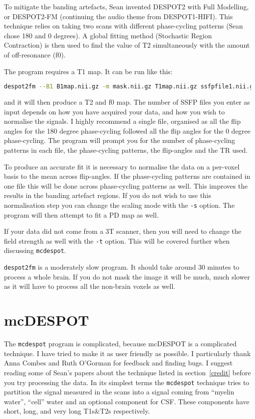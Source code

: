 \documentclass{report}
\begin{document}
To mitigate the banding artefacts, Sean invented DESPOT2 with Full Modelling, or DESPOT2-FM (continuing the audio theme from DESPOT1-HIFI). This technique relies on taking two scans with different phase-cycling patterns (Sean chose 180 and 0 degrees). A global fitting method (Stochastic Region Contraction) is then used to find the value of T2 simultaneously with the amount of off-resonance (f0).

The program requires a T1 map. It can be run like this:

\begin{lstlisting}[language=sh]
despot2fm --B1 B1map.nii.gz -m mask.nii.gz T1map.nii.gz ssfpfile1.nii.gz ssfpfile2.nii.gz
\end{lstlisting}

and it will then produce a T2 and f0 map. The number of SSFP files you enter as input depends on how you have acquired your data, and how you wish to normalise the signals. I highly recommend a single file, organised as all the flip angles for the 180 degree phase-cycling followed all the flip angles for the 0 degree phase-cycling. The program will prompt you for the number of phase-cycling patterns in each file, the phase-cycling patterns, the flip-angles and the TR used.

To produce an accurate fit it is necessary to normalise the data on a per-voxel basis to the mean across flip-angles. If the phase-cycling patterns are contained in one file this will be done across phase-cycling patterns as well. This improves the results in the banding artefact regions. If you do not wish to use this normalisation step you can change the scaling mode with the \texttt{-s} option. The program will then attempt to fit a PD map as well.

If your data did not come from a 3T scanner, then you will need to change the field strength as well with the \texttt{-t} option. This will be covered further when discussing \texttt{mcdespot}.

\texttt{despot2fm} is a moderately slow program. It should take around 30 minutes to process a whole brain. If you do not mask the image it will be much, much slower as it will have to process all the non-brain voxels as well.

\section{mcDESPOT}

The \texttt{mcdespot} program is complicated, because mcDESPOT is a complicated technique. I have tried to make it as user friendly as possible. I particularly thank Anna Combes and Ruth O'Gorman for feedback and finding bugs. I suggest reading some of Sean's papers about the technique listed in section~\ref{credit} before you try processing the data. In its simplest terms the \texttt{mcdespot} technique tries to partition the signal measured in the scans into a signal coming from ``myelin water'', ``cell'' water and an optional component for CSF. These components have short, long, and very long T1s\&T2s respectively.
\end{document}
